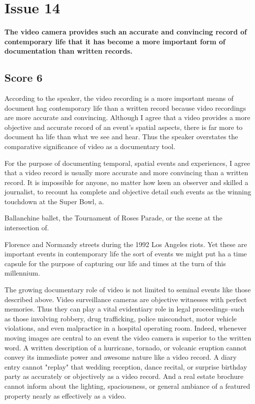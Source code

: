 \section{Issue 14}
\paragraph{
The video camera provides such an accurate and convincing record of contemporary life that it has become a more important form of documentation than written records.
}
\subsection{Score 6}


According to the speaker, the video recording is a more important means of document hag contemporary life than a written record because video recordings are more accurate and convincing.
Although I agree that a video provides a more objective and accurate record of an event's spatial aspects, there is far more to document ha life than what we see and hear.
Thus the speaker overstates the comparative significance of video as a documentary tool.


For the purpose of documenting temporal, spatial events and experiences, I agree that a video record is usually more accurate and more convincing than a written record.
It is impossible for anyone, no matter how keen an observer and skilled a journalist, to recount ha complete and objective detail such events as the winning touchdown at the Super Bowl, a.


Ballanchine ballet, the Tournament of Roses Parade, or the scene at the intersection of.


Florence and Normandy streets during the 1992 Los Angeles riots.
Yet these are important events in contemporary life the sort of events we might put ha a time capsule for the purpose of capturing our life and times at the turn of this millennium.


The growing documentary role of video is not limited to seminal events like those described above.
Video surveillance cameras are objective witnesses with perfect memories.
Thus they can play a vital evidentiary role in legal proceedings--such as those involving robbery, drug trafficking, police misconduct, motor vehicle violations, and even malpractice in a hospital operating room.
Indeed, whenever moving images are central to an event the video camera is superior to the written word.
A written description of a hurricane, tornado, or volcanic eruption cannot convey its immediate power and awesome nature like a video record.
A diary entry cannot "replay" that wedding reception, dance recital, or surprise birthday party as accurately or objectively as a video record.
And a real estate brochure cannot inform about the lighting, spaciousness, or general ambiance of a featured property nearly as effectively as a video.


